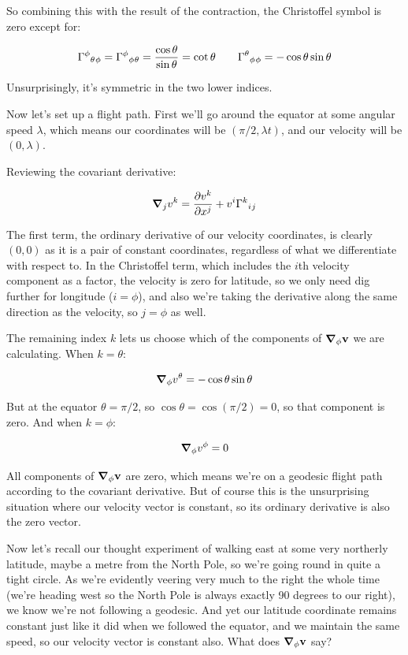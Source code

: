 So combining this with the result of the contraction, the Christoffel symbol is zero except for:

$$
\Gamma\indices{^\phi_\theta_\phi}
= \Gamma\indices{^\phi_\phi_\theta}
= \frac{\cos \theta}{\sin \theta}
= \cot \theta
\quad
\quad
\Gamma\indices{^\theta_\phi_\phi} = -\cos\theta\sin\theta
$$

Unsurprisingly, it's symmetric in the two lower indices.

Now let's set up a flight path. First we'll go around the equator at some angular speed $\lambda$, which means our coordinates will be $(\pi / 2, \lambda t)$, and our velocity will be $(0, \lambda)$.

Reviewing the covariant derivative:

$$
\grad_j v^k
= 
\frac{\partial v^k}{\partial x^j}
+ v^i \Gamma\indices{^k_i_j}
$$

The first term, the ordinary derivative of our velocity coordinates, is clearly $(0, 0)$ as it is a pair of constant coordinates, regardless of what we differentiate with respect to. In the Christoffel term, which includes the $i$th velocity component as a factor, the velocity is zero for latitude, so we only need dig further for longitude ($i=\phi$), and also we're taking the derivative along the same direction as the velocity, so $j=\phi$ as well.

The remaining index $k$ lets us choose which of the components of $\grad_{\phi} \mathbf{v}$ we are calculating. When $k=\theta$:

$$
\grad_{\phi} v^{\theta}
= -\cos\theta\sin\theta
$$

But at the equator $\theta = \pi/2$, so $\cos\theta = \cos(\pi/2) = 0$, so that component is zero. And when $k=\phi$:

$$
\grad_{\phi} v^{\phi} = 0
$$

All components of $\grad_{\phi} \mathbf{v}$ are zero, which means we're on a geodesic flight path according to the covariant derivative. But of course this is the unsurprising situation where our velocity vector is constant, so its ordinary derivative is also the zero vector.

Now let's recall our thought experiment of walking east at some very northerly latitude, maybe a metre from the North Pole, so we're going round in quite a tight circle. As we're evidently veering very much to the right the whole time (we're heading west so the North Pole is always exactly 90 degrees to our right), we know we're not following a geodesic. And yet our latitude coordinate remains constant just like it did when we followed the equator, and we maintain the same speed, so our velocity vector is constant also. What does $\grad_\phi \mathbf{v}$ say?

